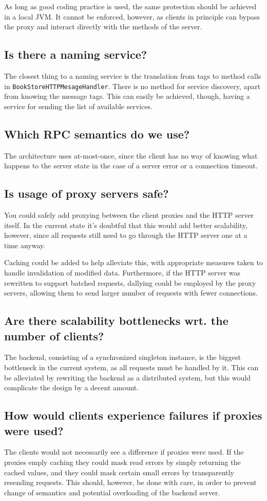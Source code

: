 \documentclass[11pt,a4paper]{article}
\begin{document}
As long as good coding practice is used, the same protection should be achieved
in a local JVM. It cannot be enforced, however, as clients in principle can
bypass the proxy and interact directly with the methods of the server.

\subsection{Is there a naming service?}
The closest thing to a naming service is the translation from tags to method
calls in \texttt{BookStoreHTTPMesageHandler}. There is no method for service
discovery, apart from knowing the message tags. This can easily be achieved,
though, having a service for sending the list of available services.

\subsection{Which RPC semantics do we use?}
The architecture uses at-most-once, since the client has no way of knowing
what happens to the server state in the case of a server error or a connection
timeout.

\subsection{Is usage of proxy servers safe?}
You could safely add proxying between the client proxies and the HTTP server
itself. In the current state it's doubtful that this would add better
scalability, however, since all requests still need to go through the HTTP
server one at a time anyway.

Caching could be added to help alleviate this, with appropriate measures taken
to handle invalidation of modified data. Furthermore, if the HTTP server was
rewritten to support batched requests, dallying could be employed by the proxy
servers, allowing them to send larger number of requests with fewer connections.

\subsection{Are there scalability bottlenecks wrt. the number of clients?}
The backend, consisting of a synchronized singleton instance, is the biggest
bottleneck in the current system, as all requests must be handled by it. This
can be alleviated by rewriting the backend as a distributed system, but this
would complicate the design by a decent amount.

\subsection{How would clients experience failures if proxies were used?}
The clients would not necessarily see a difference if proxies were used. If
the proxies emply caching they could mask read errors by simply returning
the cached values, and they could mask certain small errors by transparently
resending requests. This should, however, be done with care, in order to
prevent change of semantics and potential overloading of the backend server.
\end{document}
